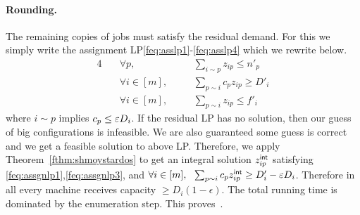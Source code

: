 \paragraph{Rounding.}
The remaining copies of jobs must satisfy the residual demand. For this we simply write the assignment LP\eqref{feq:asslp1}-\eqref{feq:asslp4} which we rewrite below.
\begin{alignat}{4}
	& \quad \forall p,   &&\quad  \textstyle \sum_{i\sim p} z_{ip} \leq n'_p \label{feq:assgnlp1} \\
	& \quad \forall i\in [m] ,  &&\quad  \textstyle \sum_{p\sim i} c_pz_{ip}  \geq D'_i \label{feq:assgnlp2}\\
	& \quad \forall i\in [m], && \quad \textstyle \sum_{p\sim i} z_{ip}  \leq  f'_i \label{feq:assgnlp3}
\end{alignat}
where $i\sim p$ implies $c_p\leq \varepsilon D_i$. If the residual LP has no solution, then our guess of big configurations is infeasible.
We are also guaranteed some guess is correct and we get a feasible solution to above LP.
Therefore, we apply Theorem~\ref{fthm:shmoystardos} to get an integral solution $z^{\mathsf{int}}_{ip}$ satisfying \eqref{feq:assgnlp1},\eqref{feq:assgnlp3},
and $\forall i\in [m], ~~ \sum_{p\sim i} c_pz^{\mathsf{int}}_{ip}  \geq D'_i - \varepsilon D_i$.
Therefore in all every machine receives capacity $\geq D_i(1-\epsilon)$. The total running time is dominated by the enumeration step.
This proves~.
%
%
